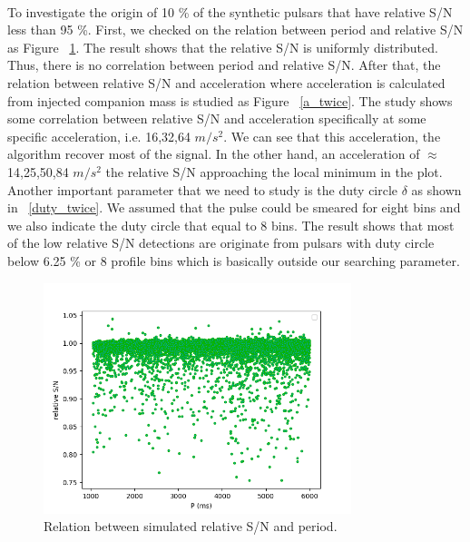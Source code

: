 \documentclass[thesis_msc.tex]{subfiles}
\begin{document}
 \paragraph{} To investigate the origin of 10 \% of the synthetic pulsars that have relative S/N less than 95 \%. First, we checked on the relation between period and relative S/N as Figure ~\ref{P_twice}. The result shows that the relative S/N is uniformly distributed. Thus, there is no correlation between period and relative S/N.  After that, the relation between relative S/N and acceleration where acceleration is calculated from injected companion mass is studied as Figure ~\ref{a_twice}. The study shows some correlation between relative S/N and acceleration specifically at some specific acceleration, i.e. 16,32,64 $m/s^2$. We can see that this acceleration, the algorithm recover most of the signal. In the other hand, an acceleration of $\approx$ 14,25,50,84 $m/s^2$ the relative S/N approaching the local minimum in the plot. Another important parameter that we need to study is the duty circle $\delta$ as shown in ~\ref{duty_twice}. We assumed that the pulse could be smeared for eight bins and we also indicate the duty circle that equal to 8 bins. The result shows that most of the low relative S/N detections are originate from pulsars with duty circle below 6.25 \% or 8 profile bins which is basically outside our searching parameter. 
 



 \begin{figure}[h]
\centering
\includegraphics[width=0.80\textwidth]{figures/P_twice}
\caption{Relation between simulated relative S/N and period.  }\label{P_twice}
\end{figure}
\end{document}
